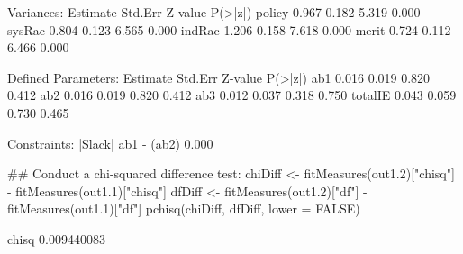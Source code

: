 \begin{Schunk}
\begin{Soutput}
Variances:
                   Estimate  Std.Err  Z-value  P(>|z|)
    policy            0.967    0.182    5.319    0.000
    sysRac            0.804    0.123    6.565    0.000
    indRac            1.206    0.158    7.618    0.000
    merit             0.724    0.112    6.466    0.000

Defined Parameters:
                   Estimate  Std.Err  Z-value  P(>|z|)
    ab1               0.016    0.019    0.820    0.412
    ab2               0.016    0.019    0.820    0.412
    ab3               0.012    0.037    0.318    0.750
    totalIE           0.043    0.059    0.730    0.465

Constraints:
                                               |Slack|
    ab1 - (ab2)                                  0.000
\end{Soutput}
\begin{Sinput}
 ## Conduct a chi-squared difference test:
 chiDiff <- fitMeasures(out1.2)["chisq"] - 
     fitMeasures(out1.1)["chisq"]
 dfDiff <- fitMeasures(out1.2)["df"] - 
     fitMeasures(out1.1)["df"]
 pchisq(chiDiff, dfDiff, lower = FALSE)
\end{Sinput}
\begin{Soutput}
      chisq 
0.009440083 
\end{Soutput}
\end{Schunk}
